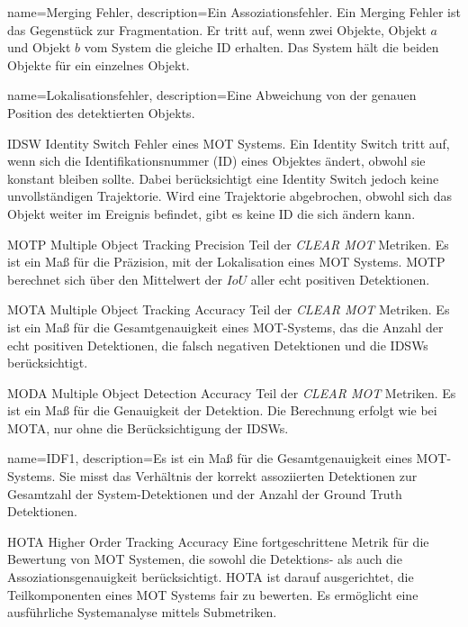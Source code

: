 {
name=Merging Fehler,
description={Ein Assoziationsfehler. Ein Merging Fehler ist das Gegenstück zur Fragmentation. Er tritt auf, wenn zwei Objekte, Objekt \(a\) und Objekt \(b\) vom System die gleiche ID erhalten. Das System hält die beiden Objekte für ein einzelnes Objekt.}
}

{
name=Lokalisationsfehler,
description={Eine Abweichung von der genauen Position des detektierten Objekts.}
}

\newglossaryentrywithacronym
{IDSW}
{Identity Switch}
{Fehler eines MOT Systems. Ein Identity Switch tritt auf, wenn sich die Identifikationsnummer (ID) eines Objektes ändert, obwohl sie konstant bleiben sollte. Dabei berücksichtigt eine Identity Switch jedoch keine unvollständigen Trajektorie. Wird eine Trajektorie
abgebrochen, obwohl sich das Objekt weiter im Ereignis befindet, gibt es keine ID die sich
ändern kann.}


\newglossaryentrywithacronym
{MOTP}
{Multiple Object Tracking Precision}
{Teil der \textit{\acrshort{CLEAR} \gls{MOT}} Metriken. Es ist ein Maß für die Präzision, mit der Lokalisation eines MOT Systems. MOTP berechnet sich über den Mittelwert der \(IoU\) aller echt positiven Detektionen.}

\newglossaryentrywithacronym
{MOTA}
{Multiple Object Tracking Accuracy}
{Teil der \textit{\acrshort{CLEAR} \gls{MOT}} Metriken. Es ist ein Maß für die Gesamtgenauigkeit eines MOT-Systems, das die Anzahl der echt positiven Detektionen, die falsch negativen Detektionen und die IDSWs berücksichtigt.}

\newglossaryentrywithacronym
{MODA}
{Multiple Object Detection Accuracy}
{Teil der \textit{\acrshort{CLEAR} \gls{MOT}} Metriken. Es ist ein Maß für die Genauigkeit der Detektion. Die Berechnung erfolgt wie bei MOTA, nur ohne die Berücksichtigung der IDSWs.}

{
name=IDF1,
description={Es ist ein Maß für die Gesamtgenauigkeit eines MOT-Systems. Sie misst das Verhältnis der korrekt assoziierten Detektionen zur Gesamtzahl der System-Detektionen und der Anzahl der Ground Truth Detektionen.}
}

\newglossaryentrywithacronym
{HOTA}
{Higher Order Tracking Accuracy}
{Eine fortgeschrittene Metrik für die Bewertung von MOT Systemen, die sowohl die Detektions- als auch die Assoziationsgenauigkeit berücksichtigt. HOTA ist darauf ausgerichtet, die Teilkomponenten eines MOT Systems fair zu bewerten. Es ermöglicht eine ausführliche Systemanalyse mittels Submetriken.}

